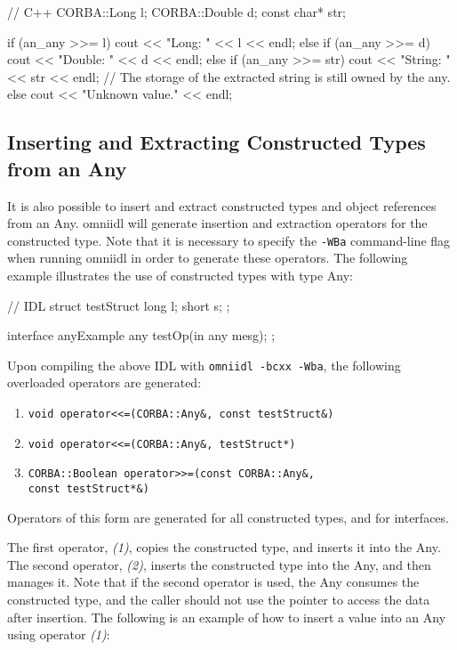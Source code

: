 \documentclass[11pt,twoside,a4paper]{book}
\begin{document}
\begin{cxxlisting}
// C++
CORBA::Long l;
CORBA::Double d;
const char* str;

if (an_any >>= l) {
  cout << "Long: " << l << endl;
}
else if (an_any >>= d) {
  cout << "Double: " << d << endl;
}
else if (an_any >>= str) {
  cout << "String: " << str << endl;
  // The storage of the extracted string is still owned by the any.
}
else {
  cout << "Unknown value." << endl;
}
\end{cxxlisting}


\subsection{Inserting and Extracting Constructed Types from an Any}

It is also possible to insert and extract constructed types and object
references from an Any. omniidl will generate insertion and extraction
operators for the constructed type. Note that it is necessary to
specify the \texttt{-WBa} command-line flag when running omniidl in
order to generate these operators. The following example illustrates
the use of constructed types with type Any:

\begin{idllisting}
// IDL
struct testStruct {
  long l;
  short s;
};

interface anyExample {
  any testOp(in any mesg);
};
\end{idllisting}

Upon compiling the above IDL with \texttt{omniidl -bcxx -Wba}, the
following overloaded operators are generated:

\begin{enumerate}
\item \verb|void operator<<=(CORBA::Any&, const testStruct&)|
\item \verb|void operator<<=(CORBA::Any&, testStruct*)|
\item \verb|CORBA::Boolean operator>>=(const CORBA::Any&,|\\
      \verb|const testStruct*&)|
\end{enumerate}

Operators of this form are generated for all constructed types, and
for interfaces.

The first operator, \emph{(1)}, copies the constructed type, and
inserts it into the Any. The second operator, \emph{(2)}, inserts the
constructed type into the Any, and then manages it. Note that if the
second operator is used, the Any consumes the constructed type, and
the caller should not use the pointer to access the data after
insertion. The following is an example of how to insert a value into
an Any using operator \emph{(1)}:
\end{document}
